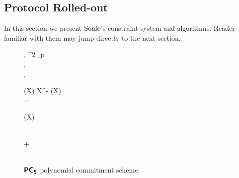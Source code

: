 \subsection{\sonic{} Protocol Rolled-out}
In this section we present ${\textnormal{{Sonic}}}$'s constraint system and algorithms. Reader
familiar with them may jump directly to the next section.

 \begin{figure}[h!]
 \centering
 	\begin{pcvstack}
 		\begin{pchstack}
 			\procedure{$\kgen(\secparam, \maxdeg)$} {
 				\alpha, \chi \sample \FF^2_p \\ [\myskip]
 				\pcreturn {},\\
         \pcind {}, \gtar{\alpha}\\
 				\hphantom{\hspace*{5.5cm}}
 		}

 			\pchspace

 			 {
 				(X) \gets \alpha \cdot X^{\dconst - \maxconst} (X) \\ [\myskip]
 				\pcreturn {} = \\ [\myskip]
 				 }
 		\end{pchstack}

 		\begin{pchstack}
 			\procedure{$\open(\srs, z, s, f(X))$}
 			{
 				(X) \gets {}\\ [\myskip]
 				\pcreturn {}\\ [\myskip]
 				\hphantom{\hspace*{5.5cm}}
 			}

 			\pchspace

 			\procedure{$\verify(\srs, \maxconst, \gone{c}, z, s, \gone{\p{o}(\chi)})$}
       {
         \pcif {} \bullet \gtwo{\alpha \chi} +  \bullet \gtwo{\alpha} = \\ [\myskip] \pcind {}
         \bullet \gtwo{\chi^{- \dconst + \maxconst}} \pcthen  {}\\
         [\myskip]
           }
 		\end{pchstack}
 	\end{pcvstack}

 	\caption{$\bm{\mathsf{PC}}_{\bm{\mathsf{S}}}$ polynomial commitment scheme.}
 	\label{fig:pcoms}
 \end{figure}



